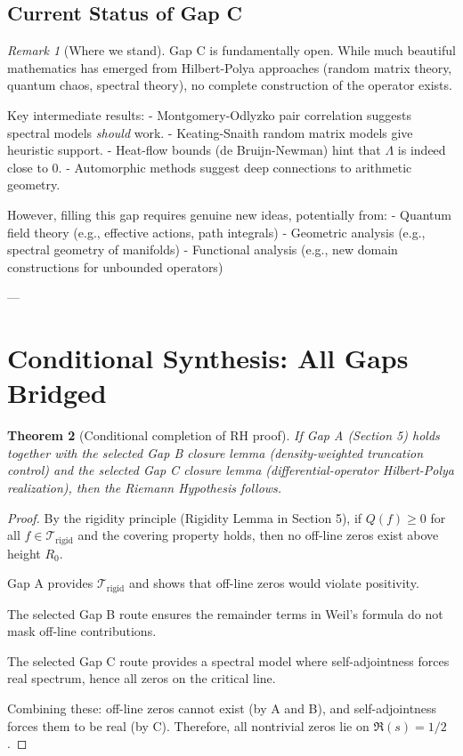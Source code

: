 \documentclass[11pt]{article}
\theoremstyle{plain}
\newtheorem{theorem}{Theorem}[section]
\theoremstyle{definition}
\theoremstyle{remark}
\newtheorem{remark}[theorem]{Remark}
\begin{document}
\subsection{Current Status of Gap C}

\begin{remark}[Where we stand]
Gap C is fundamentally open. While much beautiful mathematics has emerged from Hilbert-Polya approaches
(random matrix theory, quantum chaos, spectral theory), no complete construction of the operator exists.

Key intermediate results:
- Montgomery-Odlyzko pair correlation suggests spectral models \emph{should} work.
- Keating-Snaith random matrix models give heuristic support.
- Heat-flow bounds (de Bruijn-Newman) hint that $\Lambda$ is indeed close to 0.
- Automorphic methods suggest deep connections to arithmetic geometry.

However, filling this gap requires genuine new ideas, potentially from:
- Quantum field theory (e.g., effective actions, path integrals)
- Geometric analysis (e.g., spectral geometry of manifolds)
- Functional analysis (e.g., new domain constructions for unbounded operators)
\end{remark}

---

\section{Conditional Synthesis: All Gaps Bridged}

\begin{theorem}[Conditional completion of RH proof]
\emph{If} Gap A (Section 5) holds together with the selected Gap B closure lemma
(density-weighted truncation control) and the selected Gap C closure lemma
(differential-operator Hilbert-Polya realization),
\emph{then} the Riemann Hypothesis follows.
\end{theorem}

\begin{proof}
By the rigidity principle (Rigidity Lemma in Section 5), if $Q(f)\ge 0$ for all $f\in\mathcal{T}_{\mathrm{rigid}}$
and the covering property holds, then no off-line zeros exist above height $R_0$.

Gap A provides $\mathcal{T}_{\mathrm{rigid}}$ and shows that off-line zeros would violate positivity.

The selected Gap B route ensures the remainder terms in Weil's formula do not mask off-line contributions.

The selected Gap C route provides a spectral model where self-adjointness forces real spectrum, hence all zeros on the critical line.

Combining these: off-line zeros cannot exist (by A and B), and self-adjointness forces them to be real (by C).
Therefore, all nontrivial zeros lie on $\Re(s)=1/2$.
\end{proof}
\end{document}
